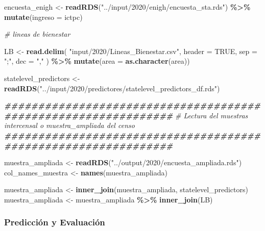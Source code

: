 \documentclass[
  12pt,
]{book}
\newenvironment{Shaded}{\begin{snugshade}}{\end{snugshade}}
\newcommand{\AttributeTok}[1]{\textcolor[rgb]{0.13,0.29,0.53}{#1}}
\newcommand{\CommentTok}[1]{\textcolor[rgb]{0.56,0.35,0.01}{\textit{#1}}}
\newcommand{\ConstantTok}[1]{\textcolor[rgb]{0.56,0.35,0.01}{#1}}
\newcommand{\DocumentationTok}[1]{\textcolor[rgb]{0.56,0.35,0.01}{\textbf{\textit{#1}}}}
\newcommand{\FunctionTok}[1]{\textcolor[rgb]{0.13,0.29,0.53}{\textbf{#1}}}
\newcommand{\NormalTok}[1]{#1}
\newcommand{\OtherTok}[1]{\textcolor[rgb]{0.56,0.35,0.01}{#1}}
\newcommand{\SpecialCharTok}[1]{\textcolor[rgb]{0.81,0.36,0.00}{\textbf{#1}}}
\newcommand{\StringTok}[1]{\textcolor[rgb]{0.31,0.60,0.02}{#1}}
\begin{document}
\begin{Shaded}
\begin{Highlighting}[]
\NormalTok{encuesta\_enigh }\OtherTok{\textless{}{-}} \FunctionTok{readRDS}\NormalTok{(}\StringTok{"../input/2020/enigh/encuesta\_sta.rds"}\NormalTok{) }\SpecialCharTok{\%\textgreater{}\%}
  \FunctionTok{mutate}\NormalTok{(}\AttributeTok{ingreso =}\NormalTok{ ictpc)}

\CommentTok{\# lineas de bienestar }

\NormalTok{LB }\OtherTok{\textless{}{-}} \FunctionTok{read.delim}\NormalTok{(}
  \StringTok{"input/2020/Lineas\_Bienestar.csv"}\NormalTok{,}
  \AttributeTok{header =} \ConstantTok{TRUE}\NormalTok{,}
  \AttributeTok{sep =} \StringTok{";"}\NormalTok{,}
  \AttributeTok{dec =} \StringTok{","}
\NormalTok{) }\SpecialCharTok{\%\textgreater{}\%} \FunctionTok{mutate}\NormalTok{(}\AttributeTok{area =} \FunctionTok{as.character}\NormalTok{(area))}

\NormalTok{statelevel\_predictors }\OtherTok{\textless{}{-}} \FunctionTok{readRDS}\NormalTok{(}\StringTok{"../input/2020/predictores/statelevel\_predictors\_df.rds"}\NormalTok{)}

\DocumentationTok{\#\#\#\#\#\#\#\#\#\#\#\#\#\#\#\#\#\#\#\#\#\#\#\#\#\#\#\#\#\#\#\#\#\#\#\#\#\#\#\#\#\#\#\#\#\#\#\#\#\#\#\#\#\#\#\#\#\#\#\#\#\#\#}
\CommentTok{\# Lectura del muestras intercensal o  muestra\_ampliada del censo}
\DocumentationTok{\#\#\#\#\#\#\#\#\#\#\#\#\#\#\#\#\#\#\#\#\#\#\#\#\#\#\#\#\#\#\#\#\#\#\#\#\#\#\#\#\#\#\#\#\#\#\#\#\#\#\#\#\#\#\#\#\#\#\#\#\#\#\#}

\NormalTok{muestra\_ampliada }\OtherTok{\textless{}{-}} \FunctionTok{readRDS}\NormalTok{(}\StringTok{"../output/2020/encuesta\_ampliada.rds"}\NormalTok{)}
\NormalTok{col\_names\_muestra }\OtherTok{\textless{}{-}} \FunctionTok{names}\NormalTok{(muestra\_ampliada)}

\NormalTok{muestra\_ampliada }\OtherTok{\textless{}{-}}  \FunctionTok{inner\_join}\NormalTok{(muestra\_ampliada, statelevel\_predictors)}
\NormalTok{muestra\_ampliada }\OtherTok{\textless{}{-}}\NormalTok{ muestra\_ampliada }\SpecialCharTok{\%\textgreater{}\%} \FunctionTok{inner\_join}\NormalTok{(LB)}
\end{Highlighting}
\end{Shaded}

\hypertarget{predicciuxf3n-y-evaluaciuxf3n}{%
\subsubsection*{Predicción y Evaluación}\label{predicciuxf3n-y-evaluaciuxf3n}}
\end{document}
